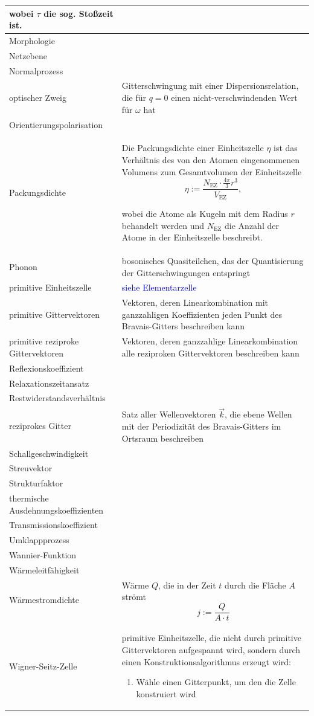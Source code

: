 \documentclass{article}
\begin{document}
\begin{xltabular}{\linewidth}{p{6cm}|X}
		wobei $\tau$ die sog. Stoßzeit ist. \\
	\hline
		Morphologie &  \\
	\hline
		Netzebene &  \\
	\hline
		Normalprozess &  \\
	\hline
		optischer Zweig & Gitterschwingung mit einer Dispersionsrelation, die für $q=0$ einen nicht-verschwindenden Wert für $\omega$ hat \\
	\hline
		Orientierungspolarisation &  \\
	\hline
		Packungsdichte & Die Packungsdichte einer Einheitszelle $\eta$ ist das Verhältnis des von den Atomen eingenommenen Volumens zum Gesamtvolumen der Einheitszelle
			$$\eta := \frac{N_\text{EZ} \cdot \frac{4\pi}{3}r^3}{V_\text{EZ}},$$
		
		wobei die Atome als Kugeln mit dem Radius $r$ behandelt werden und $N_\text{EZ}$ die Anzahl der Atome in der Einheitszelle beschreibt. \\
	\hline
		Phonon & bosonisches Quasiteilchen, das der Quantisierung der Gitterschwingungen entspringt \\
	\hline
		primitive Einheitszelle & \textcolor{blue}{siehe Elementarzelle} \\
	\hline
		primitive Gittervektoren & Vektoren, deren Linearkombination mit ganzzahligen Koeffizienten jeden Punkt des Bravais-Gitters beschreiben kann \\
	\hline
		primitive reziproke Gittervektoren & Vektoren, deren ganzzahlige Linearkombination alle reziproken Gittervektoren beschreiben kann \\
	\hline
		Reflexionskoeffizient &  \\
	\hline
		Relaxationszeitansatz &  \\
	\hline
		Restwiderstandsverhältnis &  \\
	\hline
		reziprokes Gitter & Satz aller Wellenvektoren $\vec{k}$, die ebene Wellen mit der Periodizität des Bravais-Gitters im Ortsraum beschreiben \\
	\hline
		Schallgeschwindigkeit &  \\
	\hline
		Streuvektor &  \\
	\hline
		Strukturfaktor &  \\
	\hline
		thermische Ausdehnungskoeffizienten &  \\
	\hline
		Transmissionskoeffizient &  \\
	\hline
		Umklappprozess &  \\
	\hline
		Wannier-Funktion &  \\
	\hline
		Wärmeleitfähigkeit &  \\
	\hline
		Wärmestromdichte & Wärme $Q$, die in der Zeit $t$ durch die Fläche $A$ strömt
			$$j := \frac{Q}{A\cdot t}$$ \\
	\hline
		Wigner-Seitz-Zelle & primitive Einheitszelle, die nicht durch primitive Gittervektoren aufgespannt wird, sondern  durch einen Konstruktionsalgorithmus erzeugt wird:
		{\begin{enumerate}
			\item Wähle einen Gitterpunkt, um den die Zelle konstruiert wird
		

\end{enumerate}}
\end{xltabular}
\end{document}
